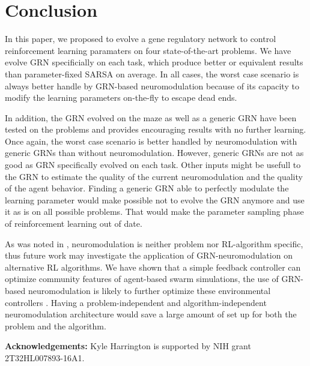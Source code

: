 \section{Conclusion}

In this paper, we proposed to evolve a gene regulatory network to control reinforcement learning paramaters on four state-of-the-art problems. We have evolve GRN specificially on each task, which produce better or equivalent results than parameter-fixed SARSA on average. In all cases, the worst case scenario is always better handle by GRN-based neuromodulation because of its capacity to modify the learning parameters on-the-fly to escape dead ends. 

In addition, the GRN evolved on the maze as well as a generic GRN have been tested on the problems and provides encouraging results with no further learning. Once again, the worst case scenario is better handled by neuromodulation with generic GRNs than without neuromodulation. However, generic GRNs are not as good as GRN specifically evolved on each task. Other inputs might be usefull to the GRN to estimate the quality of the current neuromodulation and the quality of the agent behavior. Finding a generic GRN able to perfectly modulate the learning parameter would make possible not to evolve the GRN anymore and use it as is on all possible problems. That would make the parameter sampling phase of reinforcement learning out of date.

As was noted in \cite{Schweighofer2003}, neuromodulation is neither problem nor RL-algorithm specific, thus future work may investigate the application of GRN-neuromodulation on alternative RL algorithms. We have shown that a simple feedback controller can optimize community features of agent-based swarm simulations, the use of GRN-based neuromodulation is likely to further optimize these environmental controllers \cite{Gold2014}. Having a problem-independent and algorithm-independent neuromodulation architecture would save a large amount of set up for both the problem and the algorithm.

\textbf{Acknowledgements:} Kyle Harrington is supported by NIH grant 2T32HL007893-16A1.

